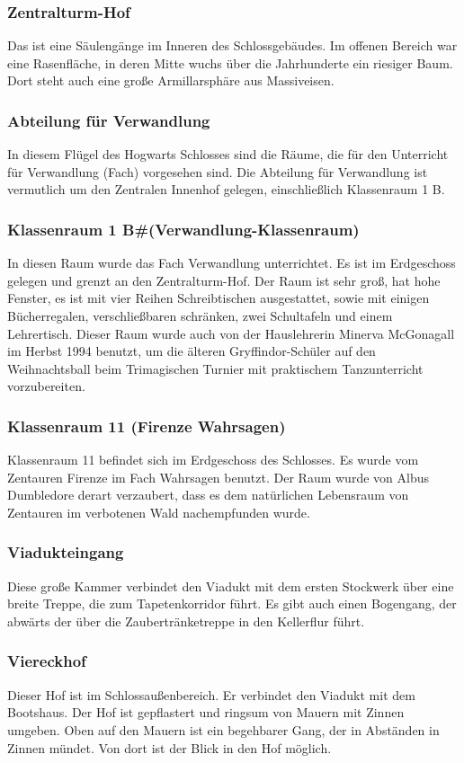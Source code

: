 \documentclass[a4paper, 10pt]{article}
\begin{document}
\subsubsection*{\large Zentralturm-Hof}
Das ist eine Säulengänge im Inneren des Schlossgebäudes. Im offenen Bereich war eine Rasenfläche, in deren Mitte wuchs über die Jahrhunderte ein riesiger Baum. Dort steht auch eine große Armillarsphäre aus Massiveisen.
\subsubsection*{\large Abteilung für Verwandlung}
In diesem Flügel des Hogwarts Schlosses sind die Räume, die für den Unterricht für Verwandlung (Fach) vorgesehen sind. Die Abteilung für Verwandlung ist vermutlich um den Zentralen Innenhof gelegen, einschließlich Klassenraum 1 B.
\subsubsection*{\large Klassenraum 1 B#(Verwandlung-Klassenraum)}
In diesen Raum wurde das Fach Verwandlung unterrichtet. Es ist im Erdgeschoss gelegen und grenzt an den Zentralturm-Hof. Der Raum ist sehr groß, hat hohe Fenster, es ist mit vier Reihen Schreibtischen ausgestattet, sowie mit einigen Bücherregalen, verschließbaren schränken, zwei Schultafeln und einem Lehrertisch. Dieser Raum wurde auch von der Hauslehrerin Minerva McGonagall im Herbst 1994 benutzt, um die älteren Gryffindor-Schüler auf den Weihnachtsball beim Trimagischen Turnier mit praktischem Tanzunterricht vorzubereiten.
\subsubsection*{\large Klassenraum 11 (Firenze Wahrsagen)}
Klassenraum 11 befindet sich im Erdgeschoss des Schlosses. Es wurde vom Zentauren Firenze im Fach Wahrsagen benutzt. Der Raum wurde von Albus Dumbledore derart verzaubert, dass es dem natürlichen Lebensraum von Zentauren im verbotenen Wald nachempfunden wurde.
\subsubsection*{\large Viadukteingang}
Diese große Kammer verbindet den Viadukt mit dem ersten Stockwerk über eine breite Treppe, die zum Tapetenkorridor führt. Es gibt auch einen Bogengang, der abwärts der über die Zaubertränketreppe in den Kellerflur führt.
\subsubsection*{\large Viereckhof}
Dieser Hof ist im Schlossaußenbereich. Er verbindet den Viadukt mit dem Bootshaus. Der Hof ist gepflastert und ringsum von Mauern mit Zinnen umgeben. Oben auf den Mauern ist ein begehbarer Gang, der in Abständen in Zinnen mündet. Von dort ist der Blick in den Hof möglich.
\end{document}
